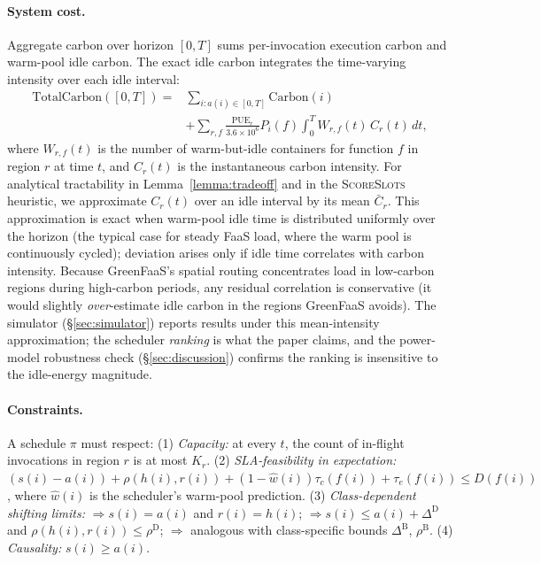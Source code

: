 \paragraph{System cost.}
\label{sec:problem:cost}
Aggregate carbon over horizon $[0, T]$ sums
per-invocation execution carbon and warm-pool idle carbon. The exact
idle carbon integrates the time-varying intensity over each idle
interval:
\begin{align}
\mathrm{TotalCarbon}([0,T]) ={}& \sum_{i: a(i) \in [0,T]} \mathrm{Carbon}(i) \nonumber \\
& + \sum_{r,f} \tfrac{\mathrm{PUE}_r}{3.6 \times 10^6} P_i(f) \int_0^T W_{r,f}(t)\,C_r(t)\,dt,
\label{eq:totalcarbon}
\end{align}
where $W_{r,f}(t)$ is the number of warm-but-idle containers for
function $f$ in region $r$ at time $t$, and $C_r(t)$ is the
instantaneous carbon intensity. For analytical tractability in
Lemma~\ref{lemma:tradeoff} and in the \textsc{ScoreSlots} heuristic,
we approximate $C_r(t)$ over an idle interval by its mean
$\bar{C}_{r}$. This approximation is exact when warm-pool idle time
is distributed uniformly over the horizon (the typical case for
steady FaaS load, where the warm pool is continuously cycled);
deviation arises only if idle time correlates with carbon intensity.
Because GreenFaaS's spatial routing concentrates load in
low-carbon regions during high-carbon periods, any residual
correlation is conservative (it would slightly \emph{over}-estimate
idle carbon in the regions GreenFaaS avoids). The simulator
(\S\ref{sec:simulator}) reports results under this mean-intensity
approximation; the scheduler \emph{ranking} is what the paper claims,
and the power-model robustness check (\S\ref{sec:discussion}) confirms
the ranking is insensitive to the idle-energy magnitude.

\paragraph{Constraints.} A schedule $\pi$ must respect:
(1) \emph{Capacity:} at every $t$, the count of in-flight invocations
in region $r$ is at most $K_r$. (2) \emph{SLA-feasibility in
expectation:} $(s(i) - a(i)) + \rho(h(i), r(i)) + (1 - \hat w(i))
\tau_c(f(i)) + \tau_e(f(i)) \le D(f(i))$, where $\hat w(i)$ is the
scheduler's warm-pool prediction. (3) \emph{Class-dependent shifting
limits:} \Interactive{} $\Rightarrow s(i) = a(i)$ and $r(i) = h(i)$;
\Deferrable{} $\Rightarrow s(i) \le a(i) + \Delta^{\mathrm{D}}$ and
$\rho(h(i), r(i)) \le \rho^{\mathrm{D}}$; \Background{} $\Rightarrow$
analogous with class-specific bounds $\Delta^{\mathrm{B}}$,
$\rho^{\mathrm{B}}$. (4) \emph{Causality:} $s(i) \ge a(i)$.

